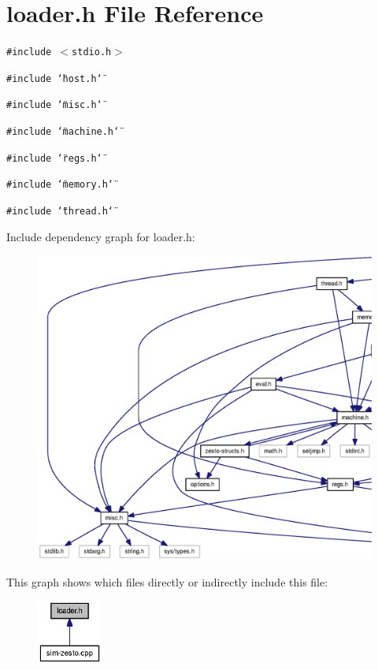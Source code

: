 \section{loader.h File Reference}
\label{loader_8h}
{\tt \#include $<$stdio.h$>$}\par
{\tt \#include \char`\"{}host.h\char`\"{}}\par
{\tt \#include \char`\"{}misc.h\char`\"{}}\par
{\tt \#include \char`\"{}machine.h\char`\"{}}\par
{\tt \#include \char`\"{}regs.h\char`\"{}}\par
{\tt \#include \char`\"{}memory.h\char`\"{}}\par
{\tt \#include \char`\"{}thread.h\char`\"{}}\par


Include dependency graph for loader.h:\nopagebreak
\begin{figure}[H]
\begin{center}
\leavevmode
\includegraphics[width=420pt]{loader_8h__incl}
\end{center}
\end{figure}


This graph shows which files directly or indirectly include this file:\nopagebreak
\begin{figure}[H]
\begin{center}
\leavevmode
\includegraphics[width=61pt]{loader_8h__dep__incl}
\end{center}
\end{figure}
